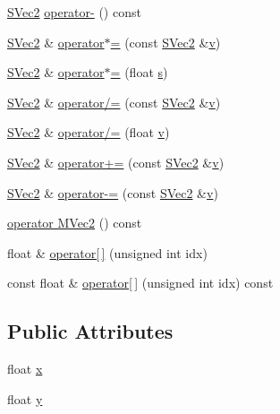 \begin{CompactItemize}
\hyperlink{struct_s_vec2}{SVec2} \hyperlink{struct_s_vec2_d089588724b686daaa90f508f8984cbd}{operator-} () const 
\item 
\hyperlink{struct_s_vec2}{SVec2} \& \hyperlink{struct_s_vec2_6233442ec43cd512a137c4f531602832}{operator$\ast$=} (const \hyperlink{struct_s_vec2}{SVec2} \&\hyperlink{glext__bak_8h_5cf89b94f7478c0ebc4429b60e7ef93b}{v})
\item 
\hyperlink{struct_s_vec2}{SVec2} \& \hyperlink{struct_s_vec2_c9e6e56e4780c65ae64f49ec689b7b6a}{operator$\ast$=} (float \hyperlink{glext__bak_8h_d585a1393cfa368fa9dc3d8ebff640d5}{s})
\item 
\hyperlink{struct_s_vec2}{SVec2} \& \hyperlink{struct_s_vec2_2e6c3bd7f5d0dd82e9f50449b160d398}{operator/=} (const \hyperlink{struct_s_vec2}{SVec2} \&\hyperlink{glext__bak_8h_5cf89b94f7478c0ebc4429b60e7ef93b}{v})
\item 
\hyperlink{struct_s_vec2}{SVec2} \& \hyperlink{struct_s_vec2_87cc708daad64a9b08b7d18408b24566}{operator/=} (float \hyperlink{glext__bak_8h_5cf89b94f7478c0ebc4429b60e7ef93b}{v})
\item 
\hyperlink{struct_s_vec2}{SVec2} \& \hyperlink{struct_s_vec2_da3d0dc973d5592451407e89de3570a5}{operator+=} (const \hyperlink{struct_s_vec2}{SVec2} \&\hyperlink{glext__bak_8h_5cf89b94f7478c0ebc4429b60e7ef93b}{v})
\item 
\hyperlink{struct_s_vec2}{SVec2} \& \hyperlink{struct_s_vec2_4c97280b8729de306dcba2c166c86906}{operator-=} (const \hyperlink{struct_s_vec2}{SVec2} \&\hyperlink{glext__bak_8h_5cf89b94f7478c0ebc4429b60e7ef93b}{v})
\item 
\hyperlink{struct_s_vec2_924be34ef14508228d4ef9836981ac33}{operator MVec2} () const 
\item 
float \& \hyperlink{struct_s_vec2_64edf0c47810834a3c115f477bcd4824}{operator\mbox{[}$\,$\mbox{]}} (unsigned int idx)
\item 
const float \& \hyperlink{struct_s_vec2_fb9bae5a1ebb0b770dbe75ae750bf1c0}{operator\mbox{[}$\,$\mbox{]}} (unsigned int idx) const 
\end{CompactItemize}
\subsection*{Public Attributes}
\begin{CompactItemize}
\item 
float \hyperlink{struct_s_vec2_328ec1b6dafebcc1eb6bf84f790f39b7}{x}
\item 
float \hyperlink{struct_s_vec2_47cf4560950d17311222a547a98c4fde}{y}
\end{CompactItemize}


